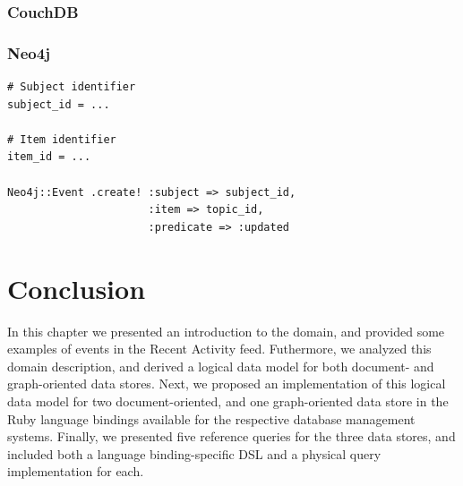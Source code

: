 \subsubsection*{CouchDB}


\subsubsection*{Neo4j}

\begin{verbatim}
# Subject identifier
subject_id = ...

# Item identifier
item_id = ...

Neo4j::Event .create! :subject => subject_id,
                      :item => topic_id,
                      :predicate => :updated
\end{verbatim}

\section{Conclusion}
\label{sec:data-model-conclusion}

In this chapter we presented an introduction to the domain, and provided some examples of events in the Recent Activity feed.
Futhermore, we analyzed this domain description, and derived a logical data model for both document- and graph-oriented data stores.
Next, we proposed an implementation of this logical data model for two document-oriented, and one graph-oriented data store in the Ruby language bindings available for the respective database management systems.
Finally, we presented five reference queries for the three data stores, and included both a language binding-specific DSL and a physical query implementation for each.

